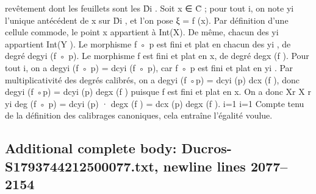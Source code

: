 \documentclass[
  10pt,
]{article}
\newenvironment{Shaded}{}{}
\newcommand{\NormalTok}[1]{#1}
\begin{document}
\begin{Shaded}
\begin{Highlighting}[]
\NormalTok{revêtement dont les feuillets sont les D̊i . Soit x ∈ C̊ ; pour tout i, on note yi l’unique}
\NormalTok{antécédent de x sur D̊i , et l’on pose ξ = f (x).}
\NormalTok{  Par définition d’une cellule commode, le point x appartient à Int(X). De même, chacun}
\NormalTok{des yi appartient Int(Y ). Le morphisme f ◦ p est fini et plat en chacun des yi , de degré}
\NormalTok{degyi (f ◦ p). Le morphisme f est fini et plat en x, de degré degx (f ).}
\NormalTok{  Pour tout i, on a degyi (f ◦ p) = dcyi (f ◦ p), car f ◦ p est fini et plat en yi . Par}
\NormalTok{multiplicativité des degrés calibrés, on a degyi (f ◦p) = dcyi (p) dcx (f ), donc degyi (f ◦p) =}
\NormalTok{dcyi (p) degx (f ) puisque f est fini et plat en x. On a donc}
\NormalTok{                   Xr                 X r}
\NormalTok{                          yi}
\NormalTok{                       deg (f ◦ p) =      dcyi (p) · degx (f ) = dcx (p) degx (f ).}
\NormalTok{                 i=1                 i=1}
\NormalTok{Compte tenu de la définition des calibrages canoniques, cela entraîne l’égalité voulue.}
\end{Highlighting}
\end{Shaded}

\subsection{Additional complete body: Ducros-S1793744212500077.txt,
newline lines
2077--2154}\label{additional-complete-body-ducros-s1793744212500077.txt-newline-lines-20772154}
\end{document}

